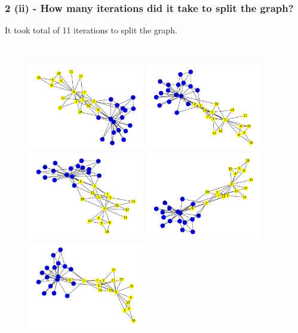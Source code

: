 \documentclass[12pt]{article}
\begin{document}
\subsubsection*{2 (ii) - How many iterations did it take to split the graph?}

It took total of 11 iterations to split the graph.

\clearpage
\\
\begin{figure}
{\includegraphics[width = 2in]{Figure_2.png}} 
{\includegraphics[width = 2in]{Figure_3.png}}
{\includegraphics[width = 2in]{Figure_4.png}}
{\includegraphics[width = 2in]{Figure_5.png}} 
{\includegraphics[width = 2in]{Figure_6.png}} 

\end{figure}
\end{document}
